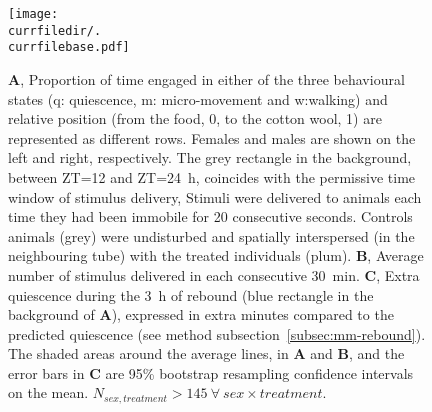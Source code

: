 \begin{figure}[h!]
	\centering   
	\texttt{[image: \\currfiledir/.\\currfilebase.pdf]}
	  \caption[Overnight dynamic sleep deprivation causes a homeostatic rebound]{
	\textbf{A}, Proportion of time engaged in either of the three behavioural states (q: quiescence, m: micro-movement and w:walking) and relative position 	(from the food, 0, to the cotton wool, 1) are represented as different rows.
	Females and males are shown on the left and right, respectively.
	The grey rectangle in the background, between ZT=12 and ZT=24~h, %
	coincides with the permissive time window of stimulus delivery,
	Stimuli were delivered to animals each time they had been immobile for 20 consecutive seconds. %
	Controls animals (grey) were undisturbed and spatially interspersed (in the neighbouring tube) with the treated individuals (plum).
	\textbf{B}, Average number of stimulus delivered in each consecutive 30~min.
	\textbf{C}, Extra quiescence during the 3~h of rebound (blue rectangle in the background of \textbf{A}), expressed in extra minutes compared to the predicted quiescence (see method subsection~\ref{subsec:mm-rebound}).
	The shaded areas around the average lines, in \textbf{A} and \textbf{B}, and the error bars in \textbf{C} are 95\% bootstrap resampling confidence intervals on the mean.
	$N_{sex,treatment} > 145~\forall~sex \times treatment$.
	\label{fig:\currfilebase}
}
\end{figure}
